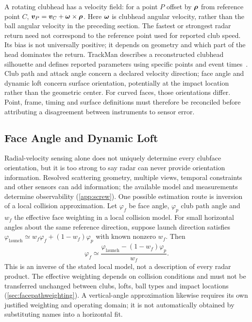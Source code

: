 A rotating clubhead has a velocity field: for a point $P$ offset by $\bm{\rho}$ from reference point $C$, $\bm{v}_P=\bm{v}_C+\bm{\omega}\times\bm{\rho}$.
Here $\bm{\omega}$ is clubhead angular velocity, rather than the ball angular velocity in the preceding section.
The fastest or strongest radar return need not correspond to the reference point used for reported club speed.
Its bias is not universally positive; it depends on geometry and which part of the head dominates the return.
TrackMan describes a reconstructed clubhead silhouette and defines reported parameters using specific points and event times~\cite{trackmanoert,trackmanclubspeed}.
Club path and attack angle concern a declared velocity direction; face angle and dynamic loft concern surface orientation, potentially at the impact location rather than the geometric center.
For curved faces, those orientations differ.
Point, frame, timing and surface definitions must therefore be reconciled before attributing a disagreement between instruments to sensor error.

\subsection{Face Angle and Dynamic Loft}
\label{sec:faceangle}

Radial-velocity sensing alone does not uniquely determine every clubface orientation, but it is too strong to say radar can never provide orientation information.
Resolved scattering geometry, multiple views, temporal constraints and other sensors can add information; the available model and measurements determine observability (\cref{app:screw}).
One possible estimation route is inversion of a local collision approximation.
Let $\varphi_f$ be face angle, $\varphi_p$ club path angle and $w_f$ the effective face weighting in a local collision model.
For small horizontal angles about the same reference direction, suppose launch direction satisfies $\varphi_{\mathrm{launch}}\simeq w_f\varphi_f+(1-w_f)\varphi_p$ with known nonzero $w_f$.
Then
\begin{equation}
\label{eq:faceinversion}
\varphi_f\simeq\frac{\varphi_{\mathrm{launch}}-(1-w_f)\varphi_p}{w_f}.
\end{equation}
This is an inverse of the stated local model, not a description of every radar product.
The effective weighting depends on collision conditions and must not be transferred unchanged between clubs, lofts, ball types and impact locations (\cref{sec:facepathweighting}).
A vertical-angle approximation likewise requires its own justified weighting and operating domain; it is not automatically obtained by substituting names into a horizontal fit.

